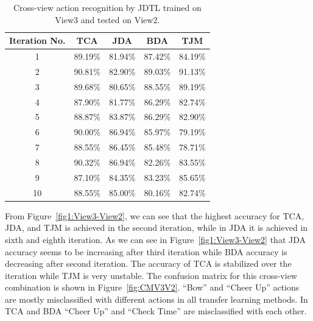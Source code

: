 \begin{table}[hbt!]
	
	\centering
	\caption{Cross-view action recognition by JDTL trained on View3 and tested on View2.} 
	\begin{tabular}{@{\extracolsep{12pt}}ccccc}
		\toprule   
		Iteration No. &  TCA & JDA & BDA & TJM\\ 
		\hline
		\midrule
		1&	89.19\%&	81.94\%&	87.42\%&	84.19\%\\
		2&	90.81\%&	82.90\%&	89.03\%&	91.13\%\\
		3&	89.68\%&	80.65\%&	88.55\%&	89.19\%\\
		4&	87.90\%&	81.77\%&	86.29\%&	82.74\%\\
		5&	88.87\%&	83.87\%&	86.29\%&	82.90\%\\
		6&	90.00\%&	86.94\%&	85.97\%&	79.19\%\\
		7&	88.55\%&	86.45\%&	85.48\%&	78.71\%\\
		8&	90.32\%&	86.94\%&	82.26\%&	83.55\%\\
		9&	87.10\%&	84.35\%&	83.23\%&	85.65\%\\
		10&	88.55\%&	85.00\%&	80.16\%&	82.74\%\\
		\bottomrule
		\hline
		\midrule
	\end{tabular}%
	\label{table10}
\end{table}

From Figure~\ref{fig1:View3-View2}, we can see that the highest accuracy for TCA, JDA, and TJM is achieved in the second iteration, while in JDA it is achieved in sixth and eighth iteration. As we can see in Figure~\ref{fig1:View3-View2} that JDA accuracy seems to be increasing after third iteration while BDA accuracy is decreasing after second iteration. The accuracy of TCA is stabilized over the iteration while TJM is very unstable. The confusion matrix for this cross-view combination is shown in Figure~\ref{fig:CMV3V2}. \enquote{Bow} and \enquote{Cheer Up} actions are mostly misclassified with different actions in all transfer learning methods. In TCA and BDA \enquote{Cheer Up} and \enquote{Check Time} are misclassified with each other.

